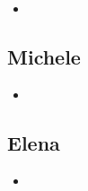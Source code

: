 \documentclass[11pt]{article}
\begin{document}
\begin{multicols*}{2}
        \begin{itemize}
            \item 
        \end{itemize}

        \subsection{Michele}

        \begin{itemize}
            \item 
        \end{itemize}

        \subsection{Elena}

        \begin{itemize}
            \item 
        \end{itemize}

        
        
    
    \end{multicols*}
\end{document}
